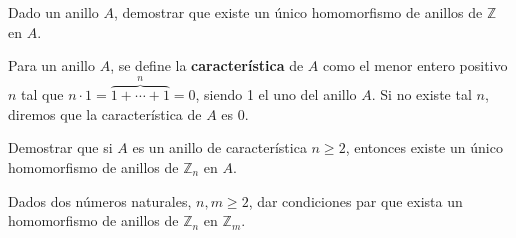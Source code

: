 \begin{ejercicio}
    Dado un anillo $A$, demostrar que existe un único homomorfismo de anillos de $\mathbb{Z}$ en $A$.
\end{ejercicio}

\begin{ejercicio}
    Para un anillo $A$, se define la \textbf{característica} de $A$ como el menor entero positivo $n$ tal que $n\cdot 1 = \overbrace{1+\cdots+1}^{n} = 0$, siendo 1 el uno del anillo $A$. Si no existe tal $n$, diremos que la característica de $A$ es 0.

    Demostrar que si $A$ es un anillo de característica $n\geq 2$, entonces existe un único homomorfismo de anillos de $\mathbb{Z}_n$ en $A$.
\end{ejercicio}

\begin{ejercicio}
    Dados dos números naturales, $n, m\geq 2$, dar condiciones par que exista un homomorfismo de anillos de $\mathbb{Z}_n$ en $\mathbb{Z}_m$.
\end{ejercicio}

\resetearcontador
\newpage
